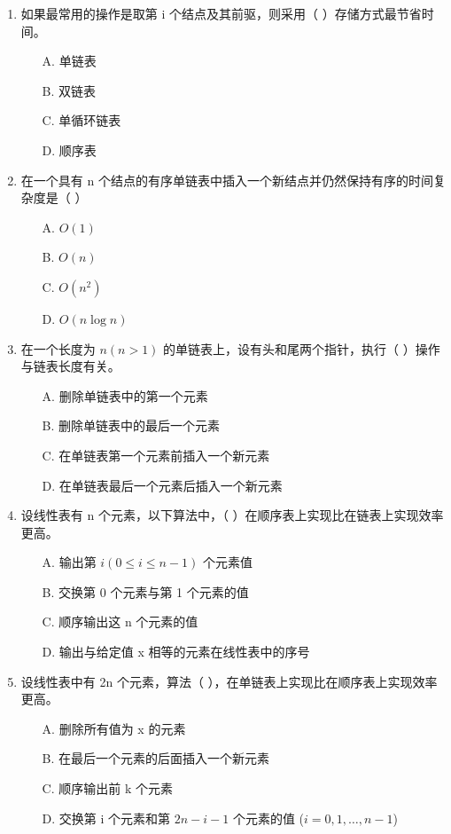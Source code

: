 \documentclass[12pt, a4paper]{article}
\begin{document}
\begin{enumerate}[label=\arabic*.]
	\item 如果最常用的操作是取第 i 个结点及其前驱，则采用（ ）存储方式最节省时间。
	      \begin{enumerate}
		      \item[A.] 单链表
		      \item[B.] 双链表
		      \item[C.] 单循环链表
		      \item[D.] 顺序表
	      \end{enumerate}

	\item 在一个具有 n 个结点的有序单链表中插入一个新结点并仍然保持有序的时间复杂度是（ ）
	      \begin{enumerate}
		      \item[A.] $O(1)$
		      \item[B.] $O(n)$
		      \item[C.] $O(n^2)$
		      \item[D.] $O(n \log n)$
	      \end{enumerate}

	\item 在一个长度为 $n (n>1)$ 的单链表上，设有头和尾两个指针，执行（ ）操作与链表长度有关。
	      \begin{enumerate}
		      \item[A.] 删除单链表中的第一个元素
		      \item[B.] 删除单链表中的最后一个元素
		      \item[C.] 在单链表第一个元素前插入一个新元素
		      \item[D.] 在单链表最后一个元素后插入一个新元素
	      \end{enumerate}

	\item 设线性表有 n 个元素，以下算法中，（ ）在顺序表上实现比在链表上实现效率更高。
	      \begin{enumerate}
		      \item[A.] 输出第 $i (0 \le i \le n-1)$ 个元素值
		      \item[B.] 交换第 0 个元素与第 1 个元素的值
		      \item[C.] 顺序输出这 n 个元素的值
		      \item[D.] 输出与给定值 x 相等的元素在线性表中的序号
	      \end{enumerate}

	\item 设线性表中有 2n 个元素，算法（ ），在单链表上实现比在顺序表上实现效率更高。
	      \begin{enumerate}
		      \item[A.] 删除所有值为 x 的元素
		      \item[B.] 在最后一个元素的后面插入一个新元素
		      \item[C.] 顺序输出前 k 个元素
		      \item[D.] 交换第 i 个元素和第 $2n-i-1$ 个元素的值 ($i=0, 1, \dots, n-1$)
	      \end{enumerate}


\end{enumerate}
\end{document}
